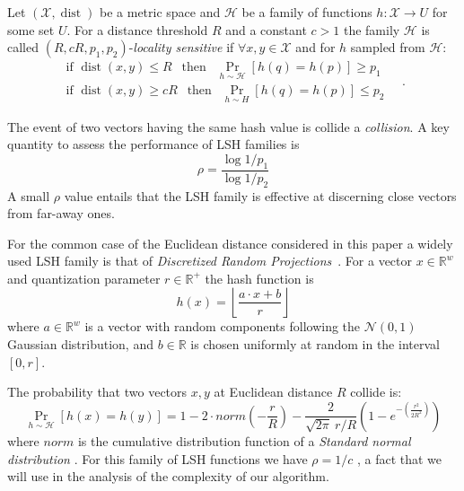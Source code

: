 \begin{definition}
\label{def:lsh}
Let $(\mathcal{X}, \operatorname{dist})$ be a metric space
and $\mathcal{H}$ be a family of functions $h: \mathcal{X} \to U$ for some set $U$. 
For a distance threshold $R$ and a constant $c>1$ the family $\mathcal{H}$ is called
$(R,cR,p_1,p_2)$-\textit{locality sensitive}
if $\forall x,y \in \mathcal{X}$ and
for $h$ sampled from $\mathcal{H}$:
\begin{equation}
\label{eq:lsh}
\begin{split}
    \text{if }
        \operatorname{dist}(x, y)\leq R 
        ~~\text{ then } ~~
        \Pr_{h\sim \mathcal{H}}\left[h\left(q\right)=h\left(p\right)\right]\geq p_1 \\
    \text{if }
        \operatorname{dist}(x, y)\geq cR 
        ~~\text{ then }~~
        \Pr_{h\sim H}\left[h\left(q\right)=h\left(p\right)\right]\leq p_2
\end{split}
\quad.
\end{equation}
\end{definition}
The event of two vectors having the same hash value is collide a \emph{collision}.
A key quantity to assess the performance of LSH families is
\[
\rho=\frac{\log 1/p_1}{\log 1/p_2}
\]
A small $\rho$ value entails that the LSH family is effective at discerning close vectors from far-away ones.


For the common case of the Euclidean distance considered in this paper a widely used LSH family is that of \emph{Discretized Random Projections}~\cite{datar2004}.
For a vector $x\in \mathbb{R}^w$ and quantization parameter $r\in \mathbb{R}^+$ the hash function is
\begin{equation}
    h(x) = \left\lfloor \frac{a\cdot x+b}{r} \right\rfloor
    \label{eq:drp}
\end{equation}
where $a\in\mathbb{R}^w$ is a vector with random components following the $\mathcal{N}(0,1)$ Gaussian distribution, and $b\in\mathbb{R}$ is chosen uniformly at random in the interval $[0,r]$.

The probability that two vectors $x,y$ at Euclidean distance $R$ collide is:
\begin{equation}\label{eq:eucl-collision-probability}
    \Pr_{h\sim\mathcal{H}}\left[h(x) = h(y)\right] = 1-2\cdot norm\left(-\frac{r}{R}\right)-\frac{2}{\sqrt{2\pi}~r/R}\left(1-e^{-\left(\frac{r^2}{2R^2}\right)}\right)
\end{equation}
where $norm$ is the cumulative distribution function of a \textit{Standard normal distribution} \cite{datar2004}.
For this family of LSH functions we have $\rho = 1/c$ \cite{rhoboundlsh},
a fact that we will use in the analysis of the complexity of our algorithm.


